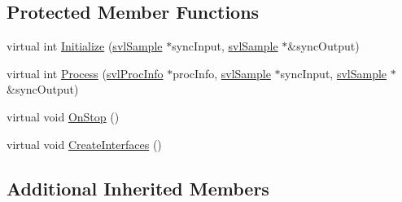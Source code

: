 \subsection*{Protected Member Functions}
\begin{DoxyCompactItemize}
\item 
virtual int \hyperlink{classsvl_filter_image_overlay_a5bc58766f4b4b26c27b3a11215482e82}{Initialize} (\hyperlink{classsvl_sample}{svl\-Sample} $\ast$sync\-Input, \hyperlink{classsvl_sample}{svl\-Sample} $\ast$\&sync\-Output)
\item 
virtual int \hyperlink{classsvl_filter_image_overlay_a9c9ee1c08fa8e647597ce6b484b01607}{Process} (\hyperlink{structsvl_proc_info}{svl\-Proc\-Info} $\ast$proc\-Info, \hyperlink{classsvl_sample}{svl\-Sample} $\ast$sync\-Input, \hyperlink{classsvl_sample}{svl\-Sample} $\ast$\&sync\-Output)
\item 
virtual void \hyperlink{classsvl_filter_image_overlay_a062f860bb4efedcf5d67ef616c5a8ab6}{On\-Stop} ()
\item 
virtual void \hyperlink{classsvl_filter_image_overlay_ae012a89b44bd3b6f6c510e01a1b43603}{Create\-Interfaces} ()
\end{DoxyCompactItemize}
\subsection*{Additional Inherited Members}


